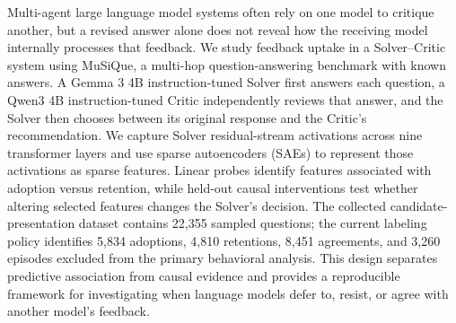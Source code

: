 Multi-agent large language model systems often rely on one model to critique
another, but a revised answer alone does not reveal how the receiving model
internally processes that feedback. We study feedback uptake in a
Solver--Critic system using MuSiQue, a multi-hop question-answering benchmark
with known answers. A Gemma 3 4B instruction-tuned Solver first answers each
question, a Qwen3 4B instruction-tuned Critic independently reviews that
answer, and the Solver then chooses between its original response and the
Critic's recommendation. We capture Solver residual-stream activations across
nine transformer layers and use sparse autoencoders (SAEs) to represent those
activations as sparse features. Linear probes identify features associated
with adoption versus retention, while held-out causal interventions test
whether altering selected features changes the Solver's decision. The
collected candidate-presentation dataset contains 22,355 sampled questions;
the current labeling policy identifies 5,834 adoptions, 4,810 retentions,
8,451 agreements, and 3,260 episodes excluded from the primary behavioral
analysis. This design separates predictive association from causal evidence
and provides a reproducible framework for investigating when language models
defer to, resist, or agree with another model's feedback.
